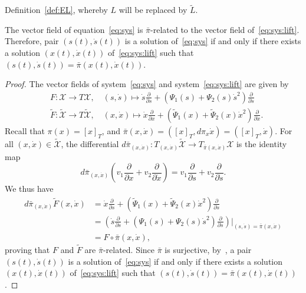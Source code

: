 Definition~\ref{def:EL}, whereby $L$ will be replaced by $\tilde L$.
\begin{lemma}
	\label{thm:lem1}
	The vector field of equation~\eqref{eq:sys} is $\bar{\pi}$-related to the
	vector field of~\eqref{eq:sys:lift}. Therefore, pair $(s(t),\dot
	s(t))$ is a solution of~\eqref{eq:sys} if and only if there exists a
	solution $( x(t),\dot x(t))$ of~\eqref{eq:sys:lift} such that
	$(s(t),\dot s(t)) = \bar{\pi}(x(t),\dot x(t))$.
\end{lemma}
\begin{proof}
	The vector fields of system~\eqref{eq:sys} and
	system~\eqref{eq:sys:lift} are given by
				\[
	\begin{aligned}
	& F: \mathcal{X} \rightarrow T\mathcal{X}, \quad (s,\dot{s})\mapsto \dot{s}
	\frac{\partial}{\partial s} + \left( \Psi_1(s)+\Psi_2(s)\dot{s}^2
	\right) \frac{\partial}{\partial \dot s} \\
			& \tilde F: \tilde{\mathcal{X}} \rightarrow T\tilde{\mathcal{X}}, \quad (x,\dot{x})\mapsto
	\dot{x} \frac{\partial}{\partial x} + \left( \tilde \Psi_1(x)+\tilde
	\Psi_2(x)\dot{x}^2 \right) \frac{\partial}{\partial \dot x}.
	\end{aligned}
	\]
				Recall that $\pi(x) = [x]_T$, and $\bar{\pi}(x,\dot x) =
	([x]_T,d\pi_{x}\dot x) =([x]_T,\dot x)$. For all $(x,\dot x) \in
	\tilde{\mathcal{X}}$, the differential $d\bar{\pi}_{(x,\dot x)}: T_{(x,\dot x)}
	\tilde{\mathcal{X}} \to T_{\bar{\pi}(x,\dot x)} \mathcal{X}$ is the identity map
				\[
	d \bar{\pi}_{(x,\dot x)} \left(v_1 \frac{ \partial} {\partial x} + v_2
	\frac{\partial} { \partial \dot x}\right) = v_1 \frac{\partial}
	{\partial s} + v_2 \frac{\partial} {\partial \dot s}.
	\]
				We thus have
					\[
	\begin{aligned}
	d\bar{\pi}_{(x,\dot{x})}\tilde F(x,\dot{x}) &=\dot{x}
	\frac{\partial}{\partial s} + \left(
	\tilde{\Psi}_1(x)+\tilde{\Psi}_2(x)\dot{x}^2\right) \frac{\partial} {
		\partial \dot s}\\
		&= \left( \dot s \frac{\partial}{\partial s} + \left(
	\Psi_1(s)+\Psi_2(s)\dot s^2\right) \frac{\partial}{\partial \dot
		s}\right)\Bigg|_{(s,\dot s)= \bar{\pi}(x,\dot x)} \\
		&=F \circ \bar{\pi}(x, \dot x),
	\end{aligned}
	\]
				proving that $F$ and $\tilde F$ are $\bar{\pi}$-related.
	Since $\bar{\pi}$ is surjective, by~\cite[Proposition~9.6]{Lee13}, a
	pair $(s(t),\dot s(t))$ is a solution of~\eqref{eq:sys} if and only if
	there exists a solution $( x(t),\dot x(t))$ of~\eqref{eq:sys:lift}
	such that $(s(t),\dot s(t)) = \bar{\pi}(x(t),\dot x(t))$.
	\qquad\end{proof}
